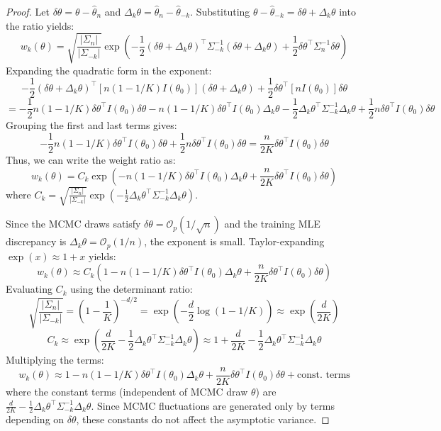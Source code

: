 \documentclass[12pt]{article}
\begin{document}
\begin{proof}
Let $\delta\theta = \theta - \hat{\theta}_n$ and $\Delta_k \theta = \hat{\theta}_n - \hat{\theta}_{-k}$. Substituting $\theta - \hat{\theta}_{-k} = \delta\theta + \Delta_k \theta$ into the ratio yields:
\[
w_k(\theta) = \sqrt{\frac{|\Sigma_n|}{|\Sigma_{-k}|}} \exp\left( -\frac{1}{2} (\delta\theta + \Delta_k \theta)^\top \Sigma_{-k}^{-1} (\delta\theta + \Delta_k \theta) + \frac{1}{2} \delta\theta^\top \Sigma_n^{-1} \delta\theta \right)
\]
Expanding the quadratic form in the exponent:
\[
-\frac{1}{2} (\delta\theta + \Delta_k \theta)^\top [n(1 - 1/K) I(\theta_0)] (\delta\theta + \Delta_k \theta) + \frac{1}{2} \delta\theta^\top [n I(\theta_0)] \delta\theta
\]
\[
= -\frac{1}{2} n(1 - 1/K) \delta\theta^\top I(\theta_0) \delta\theta - n(1 - 1/K) \delta\theta^\top I(\theta_0) \Delta_k \theta - \frac{1}{2} \Delta_k \theta^\top \Sigma_{-k}^{-1} \Delta_k \theta + \frac{1}{2} n \delta\theta^\top I(\theta_0) \delta\theta
\]
Grouping the first and last terms gives:
\[
-\frac{1}{2} n(1 - 1/K) \delta\theta^\top I(\theta_0) \delta\theta + \frac{1}{2} n \delta\theta^\top I(\theta_0) \delta\theta = \frac{n}{2K} \delta\theta^\top I(\theta_0) \delta\theta
\]
Thus, we can write the weight ratio as:
\[
w_k(\theta) = C_k \exp\left( -n(1 - 1/K) \delta\theta^\top I(\theta_0) \Delta_k \theta + \frac{n}{2K} \delta\theta^\top I(\theta_0) \delta\theta \right)
\]
where $C_k = \sqrt{\frac{|\Sigma_n|}{|\Sigma_{-k}|}} \exp\left( - \frac{1}{2} \Delta_k \theta^\top \Sigma_{-k}^{-1} \Delta_k \theta \right)$.

Since the MCMC draws satisfy $\delta\theta = \mathcal{O}_p(1/\sqrt{n})$ and the training MLE discrepancy is $\Delta_k \theta = \mathcal{O}_p(1/n)$, the exponent is small. Taylor-expanding $\exp(x) \approx 1 + x$ yields:
\[
w_k(\theta) \approx C_k \left( 1 - n(1 - 1/K) \delta\theta^\top I(\theta_0) \Delta_k \theta + \frac{n}{2K} \delta\theta^\top I(\theta_0) \delta\theta \right)
\]
Evaluating $C_k$ using the determinant ratio:
\[
\sqrt{\frac{|\Sigma_n|}{|\Sigma_{-k}|}} = \left( 1 - \frac{1}{K} \right)^{-d/2} = \exp\left( -\frac{d}{2} \log(1 - 1/K) \right) \approx \exp\left( \frac{d}{2K} \right)
\]
\[
C_k \approx \exp\left( \frac{d}{2K} - \frac{1}{2} \Delta_k \theta^\top \Sigma_{-k}^{-1} \Delta_k \theta \right) \approx 1 + \frac{d}{2K} - \frac{1}{2} \Delta_k \theta^\top \Sigma_{-k}^{-1} \Delta_k \theta
\]
Multiplying the terms:
\[
w_k(\theta) \approx 1 - n(1 - 1/K) \delta\theta^\top I(\theta_0) \Delta_k \theta + \frac{n}{2K} \delta\theta^\top I(\theta_0) \delta\theta + \text{const. terms}
\]
where the constant terms (independent of MCMC draw $\theta$) are $\frac{d}{2K} - \frac{1}{2} \Delta_k \theta^\top \Sigma_{-k}^{-1} \Delta_k \theta$. Since MCMC fluctuations are generated only by terms depending on $\delta\theta$, these constants do not affect the asymptotic variance.


\end{proof}
\end{document}
